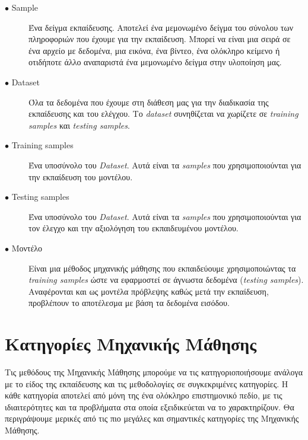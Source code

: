 \begin{description}

\item[$\bullet$ Sample] Ένα δείγμα εκπαίδευσης. Αποτελεί ένα μεμονωμένο δείγμα του σύνολου των πληροφοριών που έχουμε για την εκπαίδευση. Μπορεί να είναι μια σειρά σε ένα αρχείο με δεδομένα, μια εικόνα, ένα βίντεο, ένα ολόκληρο κείμενο ή οτιδήποτε άλλο αναπαριστά ένα μεμονωμένο δείγμα στην υλοποίηση μας.

\item[$\bullet$ Dataset] Όλα τα δεδομένα που έχουμε στη διάθεση μας για την διαδικασία της εκπαίδευσης και του ελέγχου. Το \textit{dataset} συνηθίζεται να χωρίζετε σε \textit{training samples} και \textit{testing samples}. 

\item[$\bullet$ Training samples] Ένα υποσύνολο του \textit{Dataset}. Αυτά είναι τα \textit{samples} που χρησιμοποιούνται για την εκπαίδευση του μοντέλου. 

\item[$\bullet$ Testing samples] Ένα υποσύνολο του \textit{Dataset}. Αυτά είναι τα \textit{samples} που χρησιμοποιούνται για τον έλεγχο και την αξιολόγηση του εκπαιδευμένου μοντέλου. 

\item[$\bullet$ Μοντέλο] Είναι μια μέθοδος μηχανικής μάθησης που εκπαιδεύουμε χρησιμοποιώντας τα \textit{training samples} ώστε να εφαρμοστεί σε άγνωστα δεδομένα (\textit{testing samples}). Αναφέρονται και ως μοντέλα πρόβλεψης καθώς μετά την εκπαίδευση, προβλέπουν το αποτέλεσμα με βάση τα δεδομένα εισόδου. 

\end{description}

\section{Κατηγορίες Μηχανικής Μάθησης}
Τις μεθόδους της Μηχανικής Μάθησης μπορούμε να τις κατηγοριοποιήσουμε ανάλογα με το είδος της εκπαίδευσης και τις μεθοδολογίες σε συγκεκριμένες κατηγορίες. Η κάθε κατηγορία αποτελεί από μόνη της ένα ολόκληρο επιστημονικό πεδίο, με τις ιδιαιτερότητες και τα προβλήματα στα οποία εξειδικεύεται να το χαρακτηρίζουν. Θα περιγράψουμε μερικές από τις πιο μεγάλες και σημαντικές κατηγορίες της Μηχανικής Μάθησης.

